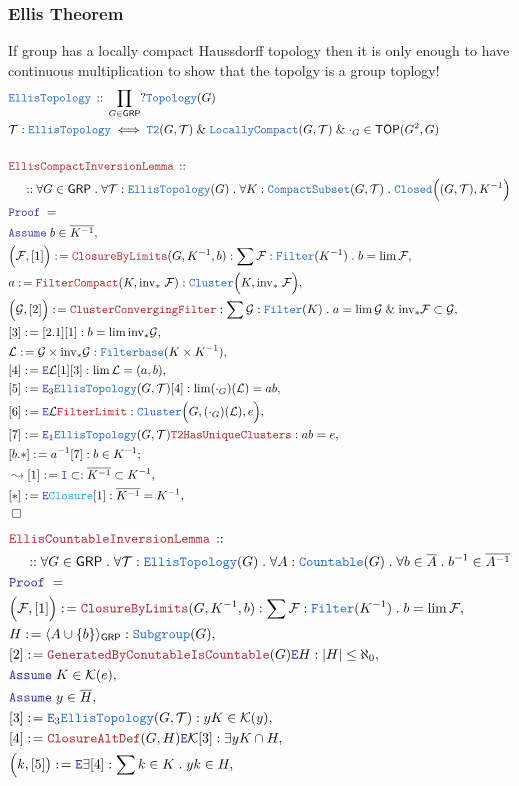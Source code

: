 \documentclass[12pt]{scrartcl}
\newcommand{\TYPE}[1]{\textcolor{NavyBlue}{\mathtt{#1}}}
\newcommand{\FUNC}[1]{\textcolor{Cerulean}{\mathtt{#1}}}
\newcommand{\LOGIC}[1]{\textcolor{Blue}{\mathtt{#1}}}
\newcommand{\THM}[1]{\textcolor{Maroon}{\mathtt{#1}}}
\renewcommand{\.}{\; . \;}
\newcommand{\de}{: \kern 0.1pc =}
\newcommand{\Theorem}[2]{& \THM{#1} \, :: \, #2 \\ & \Proof = \\ }
\newcommand{\DeclareType}[2]{& \TYPE{#1} \, :: \, #2 \\}
\newcommand{\DefineType}[3]{& #1 : \TYPE{#2} \iff #3 \\}
\newcommand{\NewLine}{\\ & \kern 1pc}
\newcommand{\Page}[1]{ \begin{align*} #1 \end{align*}   }
\renewcommand{\And}{\; \& \;}
\newcommand{\Say}[3]{& #1 \de #2 : #3, \\}
\newcommand{\Conclude}[3]{& #1 \de #2 : #3; \\}
\newcommand{\Derive}[3]{& \leadsto #1 \de #2 : #3, \\}
\newcommand{\AssumeIn}[2]{& \LOGIC{Assume} \; #1 \in #2, \\}
\newcommand{\Intro}{\LOGIC{I}}
\newcommand{\Elim}{\LOGIC{E}}
\newcommand{\QED}{\; \square}
\newcommand{\EndProof}{& \QED \\}
\newcommand{\Proof}{\LOGIC{Proof} \; }
\newcommand{\Filter}{\TYPE{Filter}}
\newcommand{\Filterbase}{\TYPE{Filterbase}}
\newcommand{\Closed}{\TYPE{Closed}}
\newcommand{\Compacts}{\TYPE{CompactSubset}}
\newcommand{\LC}{\TYPE{LocallyCompact}}
\newcommand{\TOP}{\mathsf{TOP}}
\newcommand{\T}{\mathcal{T}}
\newcommand{\F}{\mathcal{F}}
\renewcommand{\L}{\mathcal{L}}
\newcommand{\GRP}{\mathsf{GRP}}
\newcommand{\inv}{\mathrm{inv}}
\renewcommand{\L}{\mathcal{L}}
\begin{document}
\subsubsection{Ellis Theorem}
If group has a locally compact Haussdorff topology then it is only enough to have continuous multiplication to show that the topolgy is a group toplogy!  
\Page{
	\DeclareType{EllisTopology}
	{
		\prod_{G \in \GRP} 
		?\TYPE{Topology}(G)
	}
	\DefineType{\T}{EllisTopology}
	{
		\TYPE{T2}(G,\T)
		\And
		\LC(G,\T)
		\And
		\cdot_G \in \TOP(G^2,G)
	}
	\\
	\Theorem{EllisCompactInversionLemma}
	{
		\NewLine ::		
		\forall G \in \GRP \.
		\forall \T : \TYPE{EllisTopology}(G) \.
		\forall K : \Compacts(G,\T) \.
		\Closed\Big( (G,\T), K^{-1}\Big)
	}
	\AssumeIn{b}{\overline{K^{-1}}}
	\Say{\Big(\F,[1]\Big)}{\THM{ClosureByLimits}(G,K^{-1},b)}
	{
		\sum \F : \Filter(K^{-1}) \.
		b = \lim \F
	}
	\Say{a}{\THM{FilterCompact}(K,\inv_*\;\F)}{\TYPE{Cluster}\Big(K,\inv_*\;\F\Big)}
	\Say{\Big(\mathcal{G},[2]\Big)}{
		\THM{ClusterConvergingFilter}
	}
	{
		\sum \mathcal{G} : \TYPE{Filter}(K) \. a = \lim \mathcal{G} \And
		\inv_* \mathcal{F} \subset \mathcal{G} 
	}
	\Say{[3]}{[2.1][1]}{b = \lim \inv_* \mathcal{G}}
	\Say{\L}{\mathcal{G}\times \inv_* \mathcal{G}}
	{
		\Filterbase(K \times K^{-1})
	}
	\Say{[4]}{\Elim \L [1][3]}
	{
		\lim \L = (a,b)	
	}
	\Say{[5]}{\Elim_3 \TYPE{EllisTopology}(G,\T)[4]}
	{
		 \lim (\cdot_G)(\L) = ab
	}
	\Say{[6]}{\Elim \L \THM{FilterLimit}}
	{
		\TYPE{Cluster}\Big( G,  (\cdot_G)(\L), e \Big) 
	}
	\Say{[7]}{
			\Elim_1 \TYPE{EllisTopology}(G,\T)
			\THM{T2HasUniqueClusters}	
	}
	{
			ab = e
	}
	\Conclude{[b.*]}{a^{-1}[7]}{b \in K^{-1}}
	\Derive{[1]}{\Intro \subset}{\overline{K^{-1}} \subset K^{-1}}
	\Say{[*]}{\Elim \FUNC{Closure}[1]}
	{
		\overline{K^{-1}} = K^{-1}
	}	
	\EndProof
}\Page{
	\Theorem{EllisCountableInversionLemma}
	{
		\NewLine ::		
		\forall G \in \GRP \.
		\forall \T : \TYPE{EllisTopology}(G) \.
		\forall A : \TYPE{Countable}(G) \.
		\forall b \in \overline{A} \.
		b^{-1} \in \overline{A^{-1}}
	}
	\Say{\Big(\F,[1]\Big)}{\THM{ClosureByLimits}(G,K^{-1},b)}
	{
		\sum \F : \Filter(K^{-1}) \. b = \lim \F
	}
	\Say{H}{\langle A \cup \{b\}\rangle_\GRP}{\TYPE{Subgroup}(G)}
	\Say{[2]}{\THM{GeneratedByConutableIsCountable}(G)\Elim H}
	{
		|H| \le \aleph_0
	}
	\AssumeIn{K}{\mathcal{K}(e)}
	\AssumeIn{y}{\overline{H}}
	\Say{[3]}{\Elim_3 \TYPE{EllisTopology}(G,\T)}
	{
		yK \in \mathcal{K}(y)
	}
	\Say{[4]}{\THM{ClosureAltDef}(G,H)\Elim \mathcal{K}[3]}
	{
		\exists yK \cap H 
	}
	\Say{\Big(k,[5]\big)}{\Elim \exists [4]}
	{
		\sum k \in K \. yk \in H
}}
\end{document}
